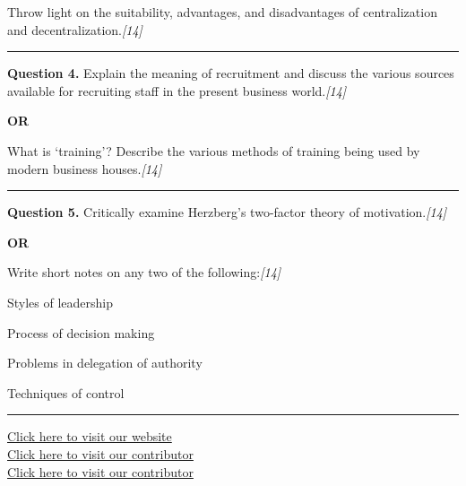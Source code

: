 \documentclass[11pt,a4paper]{article}
\newcommand{\pts}[1]{\hfill   \textit{[#1]}}
\begin{document}
Throw light on the suitability, advantages, and disadvantages of centralization and decentralization.\pts{14}

\medskip\rule{\linewidth}{0.2pt}




\noindent   \textbf{Question 4.}
Explain the meaning of recruitment and discuss the various sources available for recruiting staff in the present business world.\pts{14}

\centerline{   \textbf{OR}}

What is `training'? Describe the various methods of training being used by modern business houses.\pts{14}

\medskip\rule{\linewidth}{0.2pt}




\noindent   \textbf{Question 5.}
Critically examine Herzberg's two-factor theory of motivation.\pts{14}

\centerline{   \textbf{OR}}

Write short notes on any two of the following:\pts{14}

\begin{parts}
  \item Styles of leadership
  \item Process of decision making
  \item Problems in delegation of authority
  \item Techniques of control
\end{parts}

\vfill
\rule{\linewidth}{0.4pt}

\begin{center}\small
\href{https://bhu-exam.vercel.app/}{Click here to visit our website}\\[4pt]
\href{https://me-aryan.vercel.app/}{Click here to visit our contributor}\\[4pt]
\href{https://quashan-me.vercel.app/}{Click here to visit our contributor}
\end{center}
\end{document}
